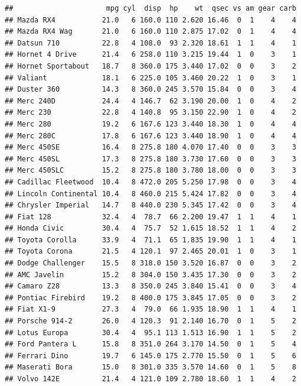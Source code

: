 \documentclass[]{report}
\newenvironment{Shaded}{\begin{snugshade}}{\end{snugshade}}
\newcommand{\KeywordTok}[1]{\textcolor[rgb]{0.13,0.29,0.53}{\textbf{#1}}}
\newcommand{\StringTok}[1]{\textcolor[rgb]{0.31,0.60,0.02}{#1}}
\newcommand{\OperatorTok}[1]{\textcolor[rgb]{0.81,0.36,0.00}{\textbf{#1}}}
\newcommand{\NormalTok}[1]{#1}
\begin{document}
\begin{verbatim}
##                      mpg cyl  disp  hp    wt  qsec vs am gear carb
## Mazda RX4           21.0   6 160.0 110 2.620 16.46  0  1    4    4
## Mazda RX4 Wag       21.0   6 160.0 110 2.875 17.02  0  1    4    4
## Datsun 710          22.8   4 108.0  93 2.320 18.61  1  1    4    1
## Hornet 4 Drive      21.4   6 258.0 110 3.215 19.44  1  0    3    1
## Hornet Sportabout   18.7   8 360.0 175 3.440 17.02  0  0    3    2
## Valiant             18.1   6 225.0 105 3.460 20.22  1  0    3    1
## Duster 360          14.3   8 360.0 245 3.570 15.84  0  0    3    4
## Merc 240D           24.4   4 146.7  62 3.190 20.00  1  0    4    2
## Merc 230            22.8   4 140.8  95 3.150 22.90  1  0    4    2
## Merc 280            19.2   6 167.6 123 3.440 18.30  1  0    4    4
## Merc 280C           17.8   6 167.6 123 3.440 18.90  1  0    4    4
## Merc 450SE          16.4   8 275.8 180 4.070 17.40  0  0    3    3
## Merc 450SL          17.3   8 275.8 180 3.730 17.60  0  0    3    3
## Merc 450SLC         15.2   8 275.8 180 3.780 18.00  0  0    3    3
## Cadillac Fleetwood  10.4   8 472.0 205 5.250 17.98  0  0    3    4
## Lincoln Continental 10.4   8 460.0 215 5.424 17.82  0  0    3    4
## Chrysler Imperial   14.7   8 440.0 230 5.345 17.42  0  0    3    4
## Fiat 128            32.4   4  78.7  66 2.200 19.47  1  1    4    1
## Honda Civic         30.4   4  75.7  52 1.615 18.52  1  1    4    2
## Toyota Corolla      33.9   4  71.1  65 1.835 19.90  1  1    4    1
## Toyota Corona       21.5   4 120.1  97 2.465 20.01  1  0    3    1
## Dodge Challenger    15.5   8 318.0 150 3.520 16.87  0  0    3    2
## AMC Javelin         15.2   8 304.0 150 3.435 17.30  0  0    3    2
## Camaro Z28          13.3   8 350.0 245 3.840 15.41  0  0    3    4
## Pontiac Firebird    19.2   8 400.0 175 3.845 17.05  0  0    3    2
## Fiat X1-9           27.3   4  79.0  66 1.935 18.90  1  1    4    1
## Porsche 914-2       26.0   4 120.3  91 2.140 16.70  0  1    5    2
## Lotus Europa        30.4   4  95.1 113 1.513 16.90  1  1    5    2
## Ford Pantera L      15.8   8 351.0 264 3.170 14.50  0  1    5    4
## Ferrari Dino        19.7   6 145.0 175 2.770 15.50  0  1    5    6
## Maserati Bora       15.0   8 301.0 335 3.570 14.60  0  1    5    8
## Volvo 142E          21.4   4 121.0 109 2.780 18.60  1  1    4    2
\end{verbatim}

\begin{Shaded}
\end{Shaded}
\end{document}
